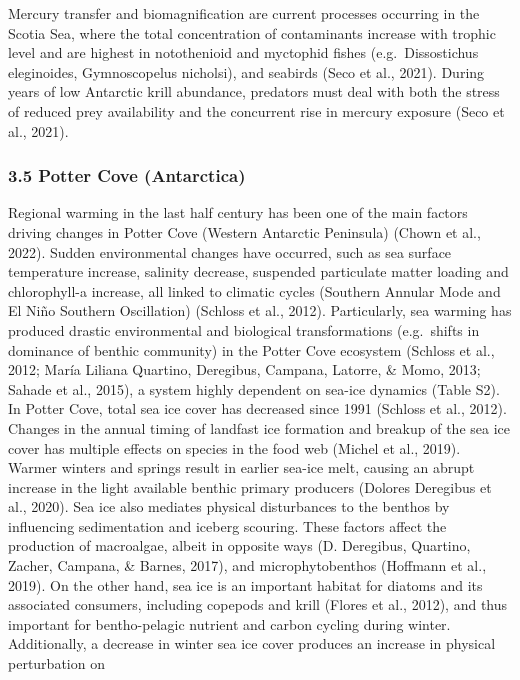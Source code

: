 \documentclass[
]{article}
\begin{document}
Mercury transfer and biomagnification are current processes occurring in
the Scotia Sea, where the total concentration of contaminants increase
with trophic level and are highest in notothenioid and myctophid fishes
(e.g.~Dissostichus eleginoides, Gymnoscopelus nicholsi), and seabirds
(Seco et al., 2021). During years of low Antarctic krill abundance,
predators must deal with both the stress of reduced prey availability
and the concurrent rise in mercury exposure (Seco et al., 2021).

\subsubsection{3.5 Potter Cove
(Antarctica)}\label{potter-cove-antarctica}

Regional warming in the last half century has been one of the main
factors driving changes in Potter Cove (Western Antarctic Peninsula)
(Chown et al., 2022). Sudden environmental changes have occurred, such
as sea surface temperature increase, salinity decrease, suspended
particulate matter loading and chlorophyll-a increase, all linked to
climatic cycles (Southern Annular Mode and El Niño Southern Oscillation)
(Schloss et al., 2012). Particularly, sea warming has produced drastic
environmental and biological transformations (e.g.~shifts in dominance
of benthic community) in the Potter Cove ecosystem (Schloss et al.,
2012; María Liliana Quartino, Deregibus, Campana, Latorre, \& Momo,
2013; Sahade et al., 2015), a system highly dependent on sea-ice
dynamics (Table S2). In Potter Cove, total sea ice cover has decreased
since 1991 (Schloss et al., 2012). Changes in the annual timing of
landfast ice formation and breakup of the sea ice cover has multiple
effects on species in the food web (Michel et al., 2019). Warmer winters
and springs result in earlier sea-ice melt, causing an abrupt increase
in the light available benthic primary producers (Dolores Deregibus et
al., 2020). Sea ice also mediates physical disturbances to the benthos
by influencing sedimentation and iceberg scouring. These factors affect
the production of macroalgae, albeit in opposite ways (D. Deregibus,
Quartino, Zacher, Campana, \& Barnes, 2017), and microphytobenthos
(Hoffmann et al., 2019). On the other hand, sea ice is an important
habitat for diatoms and its associated consumers, including copepods and
krill (Flores et al., 2012), and thus important for bentho-pelagic
nutrient and carbon cycling during winter. Additionally, a decrease in
winter sea ice cover produces an increase in physical perturbation on
\end{document}

